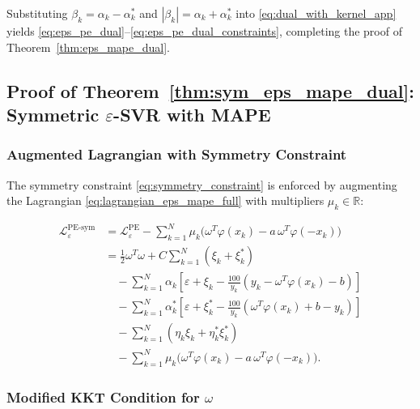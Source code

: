 \documentclass[mathematics,article,submit,pdftex,moreauthors]{Definitions/mdpi}
\begin{document}
Substituting $\beta_k = \alpha_k - \alpha_k^*$ and $|\beta_k| = \alpha_k + \alpha_k^*$ into 
\eqref{eq:dual_with_kernel_app} yields \eqref{eq:eps_pe_dual}--\eqref{eq:eps_pe_dual_constraints}, 
completing the proof of Theorem~\ref{thm:eps_mape_dual}.


\subsection{Proof of Theorem~\ref{thm:sym_eps_mape_dual}: Symmetric $\varepsilon$-SVR with MAPE}
\label{app:proof_sym_eps_mape}

\subsubsection{Augmented Lagrangian with Symmetry Constraint}

The symmetry constraint \eqref{eq:symmetry_constraint} is enforced by augmenting 
the Lagrangian \eqref{eq:lagrangian_eps_mape_full} with multipliers $\mu_k \in \mathbb{R}$:
\begin{linenomath}
\begin{equation}\label{eq:lagrangian_eps_sym_full}
\begin{aligned}
\mathcal{L}_{\varepsilon}^{\mathrm{PE\text{-}sym}} 
&= \mathcal{L}_{\varepsilon}^{\mathrm{PE}}
- \sum_{k=1}^N \mu_k\bigl(\omega^T\varphi(x_k) - a\,\omega^T\varphi(-x_k)\bigr)\\
&= \frac{1}{2}\omega^T\omega + C\sum_{k=1}^N (\xi_k + \xi_k^*)\\
&\quad - \sum_{k=1}^N \alpha_k\left[\varepsilon + \xi_k - \frac{100}{y_k}(y_k - \omega^T\varphi(x_k) - b)\right]\\
&\quad - \sum_{k=1}^N \alpha_k^*\left[\varepsilon + \xi_k^* - \frac{100}{y_k}(\omega^T\varphi(x_k) + b - y_k)\right]\\
&\quad - \sum_{k=1}^N (\eta_k\xi_k + \eta_k^*\xi_k^*)\\
&\quad - \sum_{k=1}^N \mu_k\bigl(\omega^T\varphi(x_k) - a\,\omega^T\varphi(-x_k)\bigr).
\end{aligned}
\end{equation}
\end{linenomath}

\subsubsection{Modified KKT Condition for $\omega$}
\end{document}
